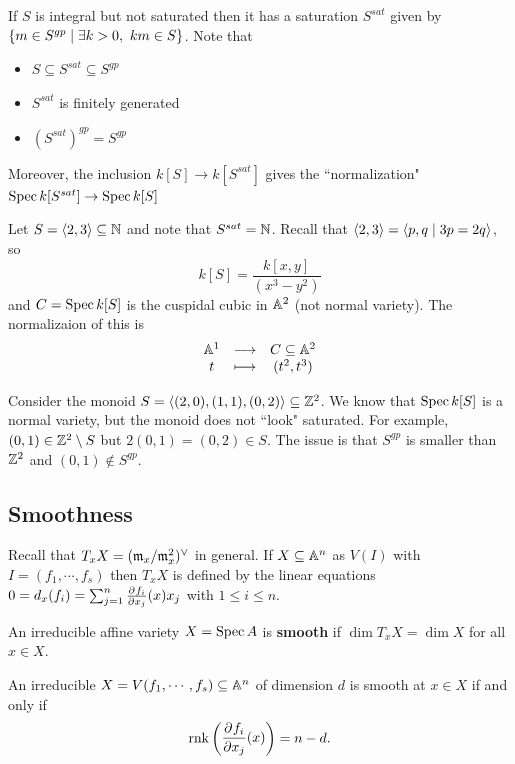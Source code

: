 \begin{remark}
If $S$ is integral but not saturated then it has a saturation $S^{sat}$ given by $\left\{{m\in S^{gp}\mid \exists k>0,\ km\in S}\right\}$. Note that 
\begin{itemize}
\item $S\subseteq S^{sat}\subseteq S^{gp}$
\item $S^{sat}$ is finitely generated
\item $(S^{sat})^{gp}=S^{gp}$
\end{itemize}
Moreover, the inclusion $k[S]\to k[S^{sat}]$ gives the ``normalization" $\operatorname{Spec} k[S^{sat}]\to \operatorname{Spec} k[S]$
\end{remark}

\begin{example}
Let $S=\left\langle {2,3}\right\rangle\subseteq \mathbb{N}$ and note that $S^{sat}=\mathbb{N}$. Recall that $\left\langle {2,3}\right\rangle=\left\langle {p,q\mid 3p=2q}\right\rangle$, so
\[k[S]=\frac{k[x,y]}{(x^3-y^2)}\]
and $C=\operatorname{Spec} k[S]$ is the cuspidal cubic in $\mathbb{A}^2$ (not normal variety). The normalizaion of this is
\[\begin{array}{ccc} {\mathbb{A}^1} & \longrightarrow & {C\subseteq \mathbb{A}^2}\\ {t} & \longmapsto & {(t^2,t^3)} \end{array}\]
\end{example}


\begin{example}
Consider the monoid $S=\left\langle {(2,0),(1,1),(0,2)}\right\rangle\subseteq \mathbb{Z}^2$. We know that $\operatorname{Spec} k[S]$ is a normal variety, but the monoid does not ``look" saturated. For example, $(0,1)\in \mathbb{Z}^2\setminus S$ but $2(0,1)=(0,2)\in S$. The issue is that $S^{gp}$ is smaller than $\mathbb{Z}^2$ and $(0,1)\notin S^{gp}$.
\end{example}

\subsection{Smoothness}

\begin{remark}
Recall that $T_xX=({\mathfrak{m}_x}/{\mathfrak{m}_x^2})^\vee$ in general. If $X\subseteq \mathbb{A}^n$ as $V(I)$ with $I=(f_1,\cdots, f_s)$ then $T_xX$ is defined by the linear equations $0=d_x(f_i)=\sum_{j=1}^n \pp{x_j}{f_i}(x)x_j$ with $1\leq i\leq n$.
\end{remark}

\begin{definition}[]
An irreducible affine variety $X=\operatorname{Spec} A$ is \textbf{smooth} if $\dim T_xX=\dim X$ for all $x\in X$.
\end{definition}

\begin{fact}
An irreducible $X=V(f_1,\cdots, f_s)\subseteq \mathbb{A}^n$ of dimension $d$ is smooth at $x\in X$ if and only if
\[\rnk\mat{\displaystyle\pp{x_j}{f_i}(x)}=n-d.\]
\end{fact}

